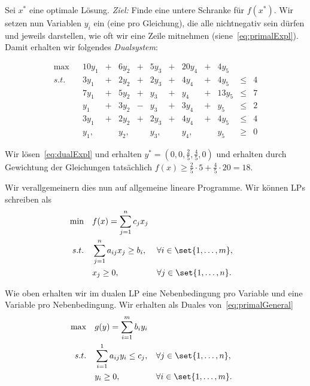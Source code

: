 \documentclass[language=ngerman,algolist]{TemplateLecture}
\begin{document}
Sei $x^*$ eine optimale Lösung. \emph{Ziel:} Finde eine untere Schranke für $f(x^*)$. Wir setzen nun Variablen $y_i$ ein (eine pro Gleichung), die alle nichtnegativ sein dürfen und jeweils darstellen, wie oft wir eine Zeile mitnehmen (siene~\eqref{eq:primalExpl}). Damit erhalten wir folgendes \emph{Dualsystem}:

\begin{equation}
    \begin{matrix}
        \max & & 10y_1 & + & 6y_2 & + & 5y_3 & + & 20y_4 & + & 4y_5 \\
        s.t. & & 3y_1 & + & 2y_2 & + & 2y_3 & + & 4y_4 & + & 4y_5 & \leq & 4 \\
        &  & 7y_1 & + & 5y_2 & + &  y_3 & + &  y_4 & + &13y_5 & \leq & 7 \\
        &  &  y_1 & + & 3y_2 & - &  y_3 & + & 3y_4 & + &  y_5 & \leq & 2 \\
        &  & 3y_1 & + & 2y_2 & + & 2y_3 & + & 4y_4 & + & 4y_5 & \leq & 4 \\
        &  & y_1, &  & y_2, & & y_3, & & y_4, & & y_5  & \geq & 0
    \end{matrix}\label{eq:dualExpl}
\end{equation}

Wir lösen~\eqref{eq:dualExpl} und erhalten $y^* = \left( 0, 0, \frac{2}{5}, \frac{4}{5}, 0 \right)$ und erhalten durch Gewichtung der Gleichungen tatsächlich $f(x) \geq \frac{2}{5} \cdot 5 + \frac{4}{5} \cdot 20 = 18$.

Wir verallgemeinern dies nun auf allgemeine lineare Programme. Wir können LPs schreiben als 
\begin{equation}
    \begin{aligned}
        \min \quad & f(x) = \sum_{j = 1}^n c_j x_j \\ 
        s.t. \quad & \sum_{j = 1}^n a_{ij} x_j \geq b_i, & & \forall i \in \set{1,\ldots,m}, \\
        & x_j \geq 0, && \forall j \in \set{1,\ldots,n}.
    \end{aligned}\label{eq:primalGeneral}
\end{equation}

Wie oben erhalten wir im dualen LP eine Nebenbedingung pro Variable und eine Variable pro Nebenbedingung. Wir erhalten als Duales von~\eqref{eq:primalGeneral}
\begin{equation}
    \begin{aligned}
        \max \quad & g(y) = \sum_{i = 1}^m b_i y_i \\ 
        s.t. \quad & \sum_{i = 1}^1 a_{ij} y_i \leq c_j, & & \forall j \in \set{1,\ldots,n}, \\
        & y_i \geq 0, && \forall i \in \set{1,\ldots,m}.
    \end{aligned}\label{eq:dualGeneral}
\end{equation}
\end{document}
